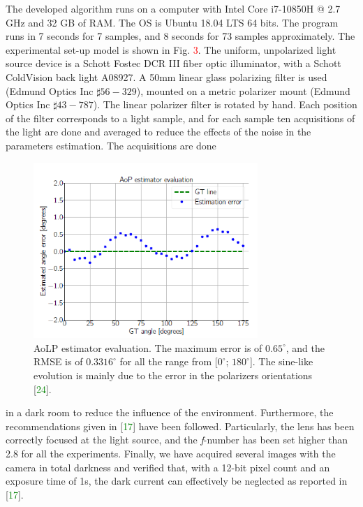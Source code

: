 \documentclass[10pt,twocolumn,letterpaper]{article}
\begin{document}
The developed algorithm runs on a computer with Intel Core i7-10850H @ 2.7 GHz and 32 GB of RAM. The OS is Ubuntu 18.04 LTS 64 bits. The program runs in 7 seconds for 7 samples, and 8 seconds for 73 samples approximately. The experimental set-up model is shown in Fig. \textcolor{red}{3}. The uniform, unpolarized light source device is a Schott Fostec DCR III fiber optic illuminator, with a Schott ColdVision back light A08927. A 50mm linear glass polarizing filter is used (Edmund Optics Inc $\sharp 56-329$), mounted on a metric polarizer mount (Edmund Optics Inc $\sharp 43-787$). The linear polarizer filter is rotated by hand. Each position of the filter corresponds to a light sample, and for each sample ten acquisitions of the light are done and averaged to reduce the effects of the noise in the parameters estimation. The acquisitions are done
\begin{figure}
    \centering
    \includegraphics[width=8.5cm]{images/Figure_2.png}
    \caption{AoLP estimator evaluation. The maximum error is of $0.65^{\circ}$, and the RMSE is of $0.3316^{\circ}$ for all the range from [$0^{\circ}$; $180^{\circ}$]. The sine-like evolution is mainly due to the error in the polarizers orientations [\textcolor{green}{24}].}
    \label{fig:my_label}
\end{figure}
in a dark room to reduce the influence of the environment. Furthermore, the recommendations given in [\textcolor{green}{17}] have been followed. Particularly, the lens has been correctly focused at the light source, and the \textit{f}-number has been set higher than 2.8 for all the experiments. Finally, we have acquired several images with the camera in total darkness and verified that, with a 12-bit pixel count and an exposure time of 1s, the dark current can effectively be neglected as reported in [\textcolor{green}{17}].
\end{document}
